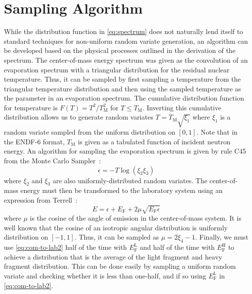 \documentclass[5p]{elsarticle}
\newcommand{\tmax}{T_{\mathrm{M}}}
\newcommand{\ef}{E_{\mathrm{F}}}
\newcommand{\efl}{E_{\mathrm{F}}^{\mathrm{L}}}
\newcommand{\efh}{E_{\mathrm{F}}^{\mathrm{H}}}
\begin{document}
\section{Sampling Algorithm}

While the distribution function in \autoref{eq:spectrum} does not naturally lend
itself to standard techniques for non-uniform random variate generation, an
algorithm can be developed based on the physical processes outlined in the
derivation of the spectrum. The center-of-mass energy spectrum was given as the
convolution of an evaporation spectrum with a triangular distribution for the
residual nuclear temperature. Thus, it can be sampled by first sampling a
temperature from the triangular temperature distribution and then using the
sampled temperature as the parameter in an evaporation spectrum. The cumulative
distribution function for temperature is $F(T) = T^2/\tmax^2$ for $T \le
\tmax$. Inverting this cumulative distribution allows us to generate random
variates $T = \tmax \sqrt{\xi_1}$ where $\xi_1$ is a random variate sampled from
the uniform distribution on $[0,1]$. Note that in the ENDF-6 format, $\tmax$ is
given as a tabulated function of incident neutron energy. An algorithm for
sampling the evaporation spectrum is given by rule C45 from the Monte Carlo
Sampler~\cite{lanl-everett-1983}:
\begin{equation*}
  \epsilon = -T \log (\xi_2 \xi_3)
\end{equation*}
where $\xi_2$ and $\xi_3$ are also uniformly-distributed random variates. The
center-of-mass energy must then be transformed to the laboratory system using an
expression from Terrell~\cite{physrev-terrell-1959}:
\begin{equation}
  E = \epsilon + \ef + 2\mu \sqrt{\ef \epsilon}
  \label{eq:com-to-lab2}
\end{equation}
where $\mu$ is the cosine of the angle of emission in the center-of-mass
system. It is well known that the cosine of an isotropic angular distribution is
uniformly distribution on $[-1,1]$. Thus, it can be sampled as $\mu = 2\xi_4 -
1$. Finally, we must use \autoref{eq:com-to-lab2} half of the time with $\efl$ and
half of the time with $\efh$ to achieve a distribution that is the average of
the light fragment and heavy fragment distribution. This can be done easily by
sampling a uniform random variate and checking whether it is less than one-half,
and if so using $\efl$ in \autoref{eq:com-to-lab2}.
\end{document}
